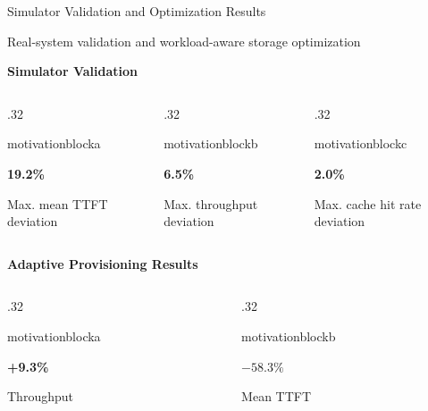 \documentclass[aspectratio=169,10pt]{beamer}
\newcommand{\tagline}[1]{{\small\color{Muted}#1\par}\vspace{.1cm}}
\newcommand{\target}[1]{\hypertarget{#1}{}}
\begin{document}
\begin{frame}[t]{Simulator Validation and Optimization Results}
\target{main-validation}\target{main-gains}\tagline{Real-system validation and workload-aware storage optimization}
{\small\bfseries\color{Accent}Simulator Validation\par}\vspace{.08cm}
\begin{columns}[T,onlytextwidth]
\begin{column}{.32\textwidth}\begin{beamercolorbox}[wd=\linewidth,sep=.12cm,center,rounded=true]{motivationblocka}{\LARGE\bfseries 19.2\%\par}\small Max. mean TTFT deviation\end{beamercolorbox}\end{column}
\begin{column}{.32\textwidth}\begin{beamercolorbox}[wd=\linewidth,sep=.12cm,center,rounded=true]{motivationblockb}{\LARGE\bfseries 6.5\%\par}\small Max. throughput deviation\end{beamercolorbox}\end{column}
\begin{column}{.32\textwidth}\begin{beamercolorbox}[wd=\linewidth,sep=.12cm,center,rounded=true]{motivationblockc}{\LARGE\bfseries 2.0\%\par}\small Max. cache hit rate deviation\end{beamercolorbox}\end{column}
\end{columns}
\vspace{.08cm}{\small Validated against real systems with GPU-only, GPU + DRAM, and GPU + disk caching.}\par
\vspace{.22cm}
{\small\bfseries\color{Accent}Adaptive Provisioning Results\par}\vspace{.08cm}
\begin{columns}[T,onlytextwidth]
\begin{column}{.32\textwidth}\begin{beamercolorbox}[wd=\linewidth,sep=.12cm,center,rounded=true]{motivationblocka}{\LARGE\bfseries +9.3\%\par}\small Throughput\end{beamercolorbox}\end{column}
\begin{column}{.32\textwidth}\begin{beamercolorbox}[wd=\linewidth,sep=.12cm,center,rounded=true]{motivationblockb}{\LARGE\bfseries $-58.3\%$\par}\small Mean TTFT\end{beamercolorbox}\end{column}

\end{columns}
\end{frame}
\end{document}
